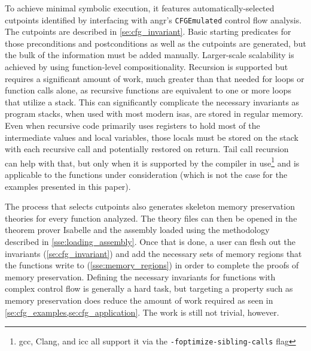 To achieve minimal symbolic execution,
it features automatically-selected cutpoints
identified by interfacing with angr's \lstinline|CFGEmulated| control flow analysis.
The cutpoints are described in \cref{se:cfg_invariant}.
Basic starting predicates for those preconditions and postconditions
as well as the cutpoints are generated,
but the bulk of the information must be added manually.
Larger-scale scalability is achieved by using function-level compositionality.
Recursion is supported but requires a significant amount of work,
much greater than that needed for loops or function calls alone,
as recursive functions are equivalent to one or more loops that utilize a stack.
This can significantly complicate the necessary invariants
as program stacks, when used with most modern \acp{isa}, are stored in regular memory.
Even when recursive code primarily uses registers
to hold most of the intermediate values and local variables,
those locals must be stored on the stack with each recursive call
and potentially restored on return.
Tail call recursion~\citep{clinger1998tail} can help with that,
but only when it is supported by the compiler in use\footnote{%
  \acs{gcc}, Clang, and \acs{icc} all support it via the \texttt{-foptimize-sibling-calls} flag
} and is applicable to the functions under consideration
(which is not the case for the examples presented in this paper).

The process that selects cutpoints
also generates skeleton memory preservation theories for every function analyzed.
The theory files can then be opened in the theorem prover Isabelle
and the assembly loaded using the methodology described in \cref{sse:loading_assembly}.
Once that is done, a user can flesh out the invariants (\cref{se:cfg_invariant})
and add the necessary sets of memory regions
that the functions write to (\cref{sse:memory_regions})
in order to complete the proofs of memory preservation.
Defining the necessary invariants for functions with complex control flow
is generally a hard task,
but targeting a property such as memory preservation
does reduce the amount of work required
as seen in \cref{se:cfg_examples,se:cfg_application}.
The work is still not trivial, however.

